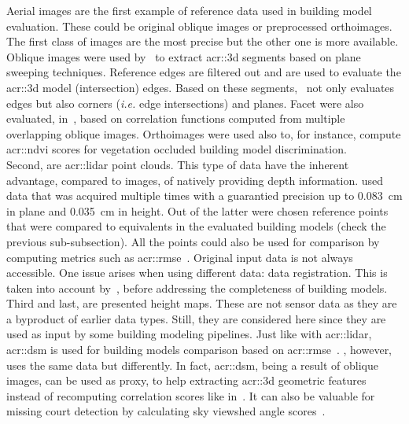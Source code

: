             Aerial images are the first example of reference data used in building model evaluation.
            These could be original oblique images or preprocessed orthoimages.
            The first class of images are the most precise but the other one is more available.
            Oblique images were used by~\textcite{michelin2013quality} to extract \gls{acr::3d} segments based on plane sweeping techniques.
            Reference edges are filtered out and are used to evaluate the \gls{acr::3d} model (intersection) edges.
            Based on these segments,~\textcite{boudet2006supervised} not only evaluates edges but also corners (\textit{i.e.} edge intersections) and planes.
            Facet were also evaluated, in~\parencite{boudet2006supervised}, based on correlation functions computed from multiple overlapping oblique images.
            Orthoimages were used also to, for instance, compute \gls{acr::ndvi} scores for vegetation occluded building model discrimination.\\
            Second, are \gls{acr::lidar} point clouds.
            This type of data have the inherent advantage, compared to images, of natively providing depth information.
            \textcite{kaartinen2005accuracy} used data that was acquired multiple times with a guarantied precision up to \SI{0.083}{\cm} in plane and \SI{0.035}{\cm} in height.
            Out of the latter were chosen reference points that were compared to equivalents in the evaluated building models (check the previous sub-subsection).
            All the points could also be used for comparison by computing metrics such as \gls{acr::rmse}~\parencite{lafarge2012creating,zhu2018large}.
            Original input data is not always accessible.
            One issue arises when using different data: data registration.
            This is taken into account by~\textcite{akca2010quality}, before addressing the completeness of building models.\\
            Third and last, are presented height maps.
            These are not sensor data as they are a byproduct of earlier data types.
            Still, they are considered here since they are used as input by some building modeling pipelines.
            Just like with \gls{acr::lidar}, \gls{acr::dsm} is used for building models comparison based on \gls{acr::rmse}~\parencite{zeng2018neural}.
            \textcite{michelin2013quality}, however, uses the same data but differently.
            In fact, \gls{acr::dsm}, being a result of oblique images, can be used as proxy, to help extracting \gls{acr::3d} geometric features instead of recomputing correlation scores like in~\parencite{boudet2006supervised}.
            It can also be valuable for missing court detection by calculating sky viewshed angle scores~\parencite{michelin2013quality}.

